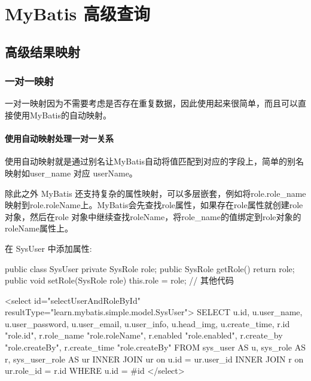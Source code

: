 \section{MyBatis 高级查询}

\subsection{高级结果映射}

\subsubsection{一对一映射}

一对一映射因为不需要考虑是否存在重复数据，因此使用起来很简单，而且可以直接使用MyBatis的自动映射。

\paragraph*{使用自动映射处理一对一关系}

使用自动映射就是通过别名让MyBatis自动将值匹配到对应的字段上，简单的别名映射如user\_name 对应 userName。

除此之外 MyBatis 还支持复杂的属性映射，可以多层嵌套，例如将role.role\_name映射到role.roleName上。MyBatis会先查找role属性，如果存在role属性就创建role 对象，然后在role 对象中继续查找roleName，将role\_name的值绑定到role对象的roleName属性上。

在 SysUser 中添加属性:
\begin{Java}
public class SysUser {
    private SysRole role;
    public SysRole getRole() {
        return role;
    }
    public void setRole(SysRole role) {
        this.role = role;
    }
    // 其他代码
}
\end{Java}

\begin{xml}
<select id="selectUserAndRoleById" resultType="learn.mybatis.simple.model.SysUser">
    SELECT u.id,
           u.user_name,
           u.user_password,
           u.user_email,
           u.user_info,
           u.head_img,
           u.create_time,
           r.id "role.id",
           r.role_name "role.roleName",
           r.enabled "role.enabled",
           r.create_by "role.createBy",
           r.create_time "role.createBy"
    FROM sys_user AS u,
         sys_role AS r,
         sys_user_role AS ur
             INNER JOIN ur on u.id = ur.user_id
             INNER JOIN r on ur.role_id = r.id
    WHERE u.id = #{id}
</select>
\end{xml}

